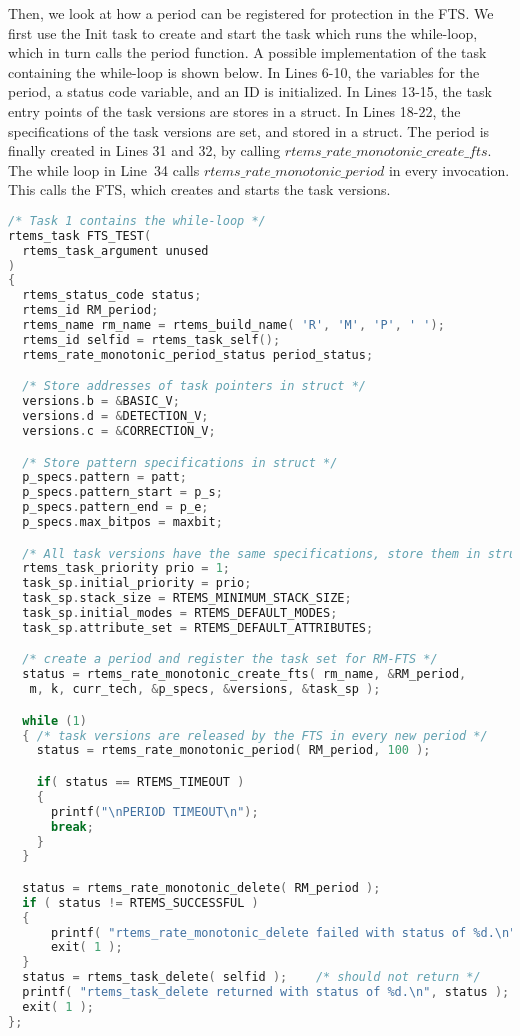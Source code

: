 Then, we look at how a period can be registered for protection in the FTS. We first use the Init task to create and start the task which runs the while-loop, which in turn calls the period function. A possible implementation of the task containing the while-loop is shown below.
In Lines 6-10, the variables for the period, a status code variable, and an ID is initialized. In Lines 13-15, the task entry points of the task versions are stores in a struct. In Lines 18-22, the specifications of the task versions are set, and stored in a struct. The period is finally created in Lines 31 and 32, by calling $rtems\_rate\_monotonic\_create\_fts$. The while loop in Line~34 calls $rtems\_rate\_monotonic\_period$ in every invocation. This calls the FTS, which creates and starts the task versions.
\begin{lstlisting}[language=C]
/* Task 1 contains the while-loop */
rtems_task FTS_TEST(
  rtems_task_argument unused
)
{
  rtems_status_code status;
  rtems_id RM_period;
  rtems_name rm_name = rtems_build_name( 'R', 'M', 'P', ' ');
  rtems_id selfid = rtems_task_self();
  rtems_rate_monotonic_period_status period_status;

  /* Store addresses of task pointers in struct */
  versions.b = &BASIC_V;
  versions.d = &DETECTION_V;
  versions.c = &CORRECTION_V;

  /* Store pattern specifications in struct */
  p_specs.pattern = patt;
  p_specs.pattern_start = p_s;
  p_specs.pattern_end = p_e;
  p_specs.max_bitpos = maxbit;

  /* All task versions have the same specifications, store them in struct */
  rtems_task_priority prio = 1; 
  task_sp.initial_priority = prio;
  task_sp.stack_size = RTEMS_MINIMUM_STACK_SIZE;
  task_sp.initial_modes = RTEMS_DEFAULT_MODES;
  task_sp.attribute_set = RTEMS_DEFAULT_ATTRIBUTES;

  /* create a period and register the task set for RM-FTS */
  status = rtems_rate_monotonic_create_fts( rm_name, &RM_period,
   m, k, curr_tech, &p_specs, &versions, &task_sp );

  while (1)
  { /* task versions are released by the FTS in every new period */
    status = rtems_rate_monotonic_period( RM_period, 100 );

    if( status == RTEMS_TIMEOUT )
    {
      printf("\nPERIOD TIMEOUT\n");
      break;
    }
  }

  status = rtems_rate_monotonic_delete( RM_period );
  if ( status != RTEMS_SUCCESSFUL )
  {
      printf( "rtems_rate_monotonic_delete failed with status of %d.\n", status );
      exit( 1 );
  }
  status = rtems_task_delete( selfid );    /* should not return */
  printf( "rtems_task_delete returned with status of %d.\n", status );
  exit( 1 );
};
\end{lstlisting}

